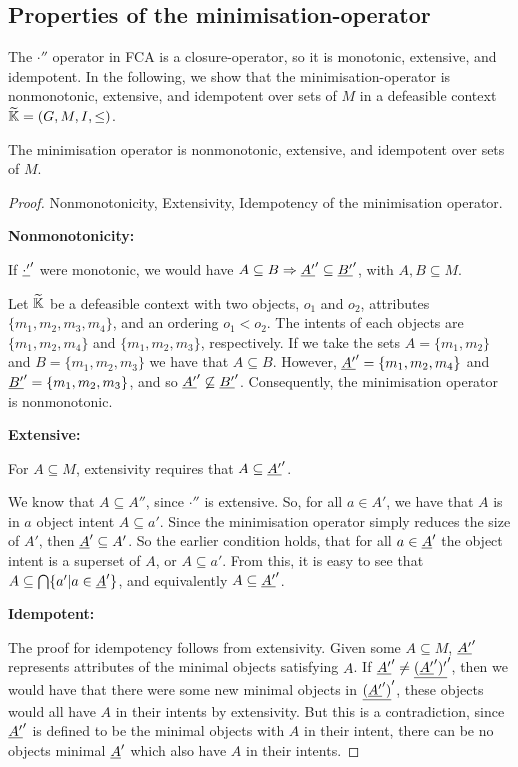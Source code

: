 \documentclass[11pt]{article}
\begin{document}
\subsection{Properties of the minimisation-operator}
\label{subsection:properties-min-operator}
The $\cdot''$ operator in FCA is a closure-operator, so it is monotonic, extensive, and idempotent. In the following, we show that the minimisation-operator is nonmonotonic, extensive, and idempotent over sets of $M$ in a defeasible context $\widetilde{\mathbb{K}} = (G,M,I,\leq)$.

\begin{proposition}
  \label{proposition-min_operator}
  The minimisation operator is nonmonotonic, extensive, and idempotent over sets of $M$.
\end{proposition}

\begin{proof}
  Nonmonotonicity, Extensivity, Idempotency of the minimisation operator.

  \textbf{Nonmonotonicity:}

  If $\underline{\cdot'}'$ were monotonic, we would have $A \subseteq B \Rightarrow \underline{A'}' \subseteq \underline{B'}'$, with $A,B \subseteq M$.

  Let $\widetilde{\mathbb{K}}$ be a defeasible context with two objects, $o_1$ and $o_2$, attributes $\{m_1, m_2, m_3, m_4\}$, and an ordering $o_1 < o_2$. The intents of each objects are $\{m_1, m_2, m_4\}$ and $\{m_1, m_2, m_3\}$, respectively. If we take the sets $A = \{m_1,m_2\}$ and $B = \{m_1, m_2, m_3\}$ we have that $A\subseteq B$. However, $\underline{A'}' = \{m_1, m_2, m_4\}$ and $\underline{B'}' = \{m_1, m_2, m_3\}$, and so $\underline{A'}' \not \subseteq \underline{B'}'$. Consequently, the minimisation operator is nonmonotonic.

  \textbf{Extensive:}

  For $A \subseteq M$, extensivity requires that $A \subseteq \underline{A'}'$.

  We know that $A \subseteq A''$, since $\cdot''$ is extensive. So, for all $a \in A'$, we have that $A$ is in $a$ object intent $A \subseteq a'$. Since the minimisation operator simply reduces the size of $A'$, then $\underline{A}' \subseteq A'$. So the earlier condition holds, that for all $a \in \underline{A}'$ the object intent is a superset of $A$, or $A \subseteq a'$. From this, it is easy to see that $A \subseteq \bigcap \{a' | a \in \underline{A}'\}$, and equivalently $A \subseteq \underline{A'}'$.

  \textbf{Idempotent:}

  The proof for idempotency follows from extensivity. Given some $A \subseteq M$, $\underline{A'}'$ represents attributes of the minimal objects satisfying $A$. If $\underline{A'}' \not =\underline{(\underline{A'}')'}'$, then we would have that there were some new minimal objects in $\underline{(\underline{A'}')}'$, these objects would all have $A$ in their intents by extensivity. But this is a contradiction, since $\underline{A'}'$ is defined to be the minimal objects with $A$ in their intent, there can be no objects minimal $\underline{A}'$ which also have $A$ in their intents.

\end{proof}
\end{document}
